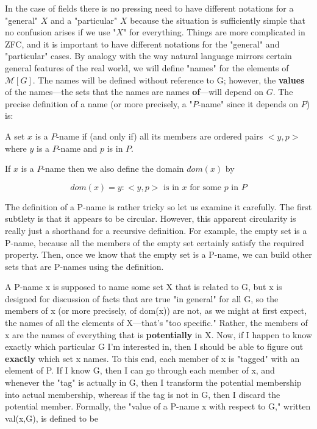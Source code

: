 \documentclass[10pt]{article}
\theoremstyle{definition}
\begin{document}
In the case of fields there is no pressing need to have different notations
for a "general" $X$ and a "particular" $X$ because the situation is sufficiently
simple that no confusion arises if we use "$X$" for everything.  Things are
more complicated in ZFC, and it is important to have different notations for
the "general" and "particular" cases.  By analogy with the way natural
language mirrors certain general features of the real world, we will define
"names" for the elements of $\mathcal{M}[G]$.  The names will be defined without
reference to G; however, the \textbf{values} of the names---the sets that the names
are names \textbf{of}---will depend on $G$.  The precise definition of a name (or
more precisely, a "$P$-name" since it depends on $P$) is:

  A set $x$ is a $P$-name if (and only if) all its members are
  ordered pairs $<y,p>$ where $y$ is a $P$-name and $p$ is in $P$.

If $x$ is a $P$-name then we also define the domain $dom(x)$ by

  $$dom(x) = {y : <y,p>\text{ is in }x\text{ for some }p\text{ in }P}$$

The definition of a P-name is rather tricky so let us examine it carefully.
The first subtlety is that it appears to be circular.  However, this
apparent circularity is really just a shorthand for a recursive definition.
For example, the empty set is a P-name, because all the members of the empty
set certainly satisfy the required property.  Then, once we know that the
empty set is a P-name, we can build other sets that are P-names using the
definition.

A P-name x is supposed to name some set X that is related to G, but x is
designed for discussion of facts that are true "in general" for all G, so
the members of x (or more precisely, of dom(x)) are not, as we might at
first expect, the names of all the elements of X---that's "too specific."
Rather, the members of x are the names of everything that is \textbf{potentially}
in X.  Now, if I happen to know exactly which particular G I'm interested
in, then I should be able to figure out \textbf{exactly} which set x names.  To
this end, each member of x is "tagged" with an element of P.  If I know G,
then I can go through each member of x, and whenever the "tag" is actually
in G, then I transform the potential membership into actual membership,
whereas if the tag is not in G, then I discard the potential member.
Formally, the "value of a P-name x with respect to G," written val(x,G), is
defined to be
\end{document}
